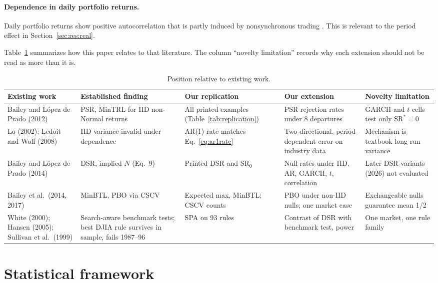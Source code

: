 \documentclass[11pt,a4paper]{article}
\newcommand{\SR}{\mathrm{SR}}
\theoremstyle{remark}
\begin{document}
\paragraph{Dependence in daily portfolio returns.} Daily portfolio returns show positive autocorrelation that is partly induced by nonsynchronous trading \citep{lo1988,lo1990}. This is relevant to the period effect in Section~\ref{sec:res:real}.

Table~\ref{tab:lit} summarizes how this paper relates to that literature. The column ``novelty limitation'' records why each extension should not be read as more than it is.

\begin{table}[t]
\centering\small
\caption{Position relative to existing work.}\label{tab:lit}
\begin{tabularx}{\textwidth}{@{}>{\raggedright\arraybackslash}p{2.5cm}>{\raggedright\arraybackslash}X>{\raggedright\arraybackslash}X>{\raggedright\arraybackslash}X>{\raggedright\arraybackslash}X@{}}
\toprule
Existing work & Established finding & Our replication & Our extension & Novelty limitation \\
\midrule
Bailey and L\'opez de Prado (2012) & PSR, MinTRL for IID non-Normal returns & All printed examples (Table~\ref{tab:replication}) & PSR rejection rates under 8 departures & GARCH and $t$ cells test only $\SR^\ast=0$ \\
Lo (2002); Ledoit and Wolf (2008) & IID variance invalid under dependence & AR(1) rate matches Eq.~\eqref{eq:ar1rate} & Two-directional, period-dependent error on industry data & Mechanism is textbook long-run variance \\
Bailey and L\'opez de Prado (2014) & DSR, implied $N$ (Eq.~9) & Printed DSR and $\mathrm{SR}_0$ & Null rates under IID, AR, GARCH, $t$, correlation & Later DSR variants (2026) not evaluated \\
Bailey et al.\ (2014, 2017) & MinBTL, PBO via CSCV & Expected max, MinBTL; CSCV counts & PBO under non-IID nulls; one market case & Exchangeable nulls guarantee mean 1/2 \\
White (2000); Hansen (2005); Sullivan et al.\ (1999) & Search-aware benchmark tests; best DJIA rule survives in sample, fails 1987--96 & SPA on 93 rules & Contrast of DSR with benchmark test, power & One market, one rule family \\
\bottomrule
\end{tabularx}
\end{table}

\section{Statistical framework}\label{sec:framework}
\end{document}
